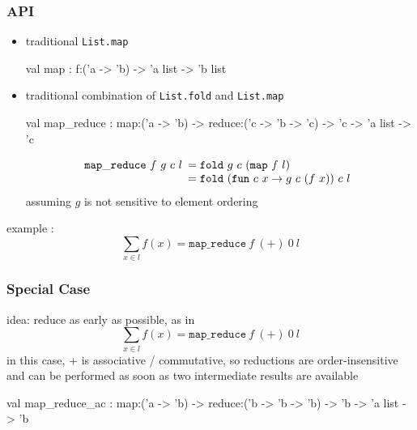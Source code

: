 \documentclass{beamer}
\let\emph\alert
\begin{document}
\begin{frame}\frametitle{API}
  \begin{itemize}
  \item traditional \texttt{List.map}
\begin{ocaml}
 val map : 
  f:('a -> 'b) -> 'a list -> 'b list
\end{ocaml}

    \bigskip
  \item traditional combination of \texttt{List.fold} and \texttt{List.map}
  
\begin{ocaml}
 val map_reduce :
  map:('a -> 'b) -> reduce:('c -> 'b -> 'c) -> 
  'c -> 'a list -> 'c
\end{ocaml}
    \begin{displaymath}
      \mathtt{map\_reduce}~f~g~c~l
      \begin{array}[t]{l}
        = \mathtt{fold}~g~c~(\mathtt{map}~f~l) \\
        = \mathtt{fold}~(\mathtt{fun}~c~x\rightarrow g~c~(f~x))~c~l\\
      \end{array}
    \end{displaymath}
    assuming $g$ is not sensitive to element ordering
  \end{itemize}

  example :
  \begin{displaymath}
    \sum_{x\in l}f(x) = \mathtt{map\_reduce}~f~(+)~0~l
  \end{displaymath}
\end{frame}

\begin{frame}\frametitle{Special Case}
  \emph{idea}: reduce as early as possible, as in
  \begin{displaymath}
    \sum_{x\in l}f(x) = \mathtt{map\_reduce}~f~(+)~0~l
  \end{displaymath}
  in this case, + is \emph{associative / commutative}, so reductions are
  order-insensitive and can be performed as soon as two intermediate
  results are available


  \begin{ocaml}
val map_reduce_ac :
  map:('a -> 'b) -> reduce:('b -> 'b -> 'b) -> 
  'b -> 'a list -> 'b
  \end{ocaml}
\end{frame}
\end{document}
